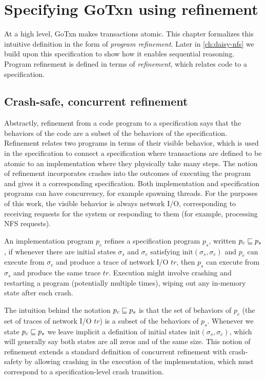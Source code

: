 \section{Specifying GoTxn using refinement}%
\label{sec:txn:spec}

At a high level, GoTxn makes transactions atomic. This chapter formalizes this
intuitive definition in the form of \emph{program refinement}. Later in
\cref{ch:daisy-nfs} we build upon this specification to show how it enables
sequential reasoning. Program refinement is defined in terms of
\emph{refinement}, which relates code to a specification.

\subsection{Crash-safe, concurrent refinement}

Abstractly, refinement from a code program to a specification says that the
behaviors of the code are a subset of the behaviors of the specification.
Refinement relates two programs in terms of their visible behavior, which is
used in the specification to connect a specification where transactions are
defined to be atomic to an implementation where they physically take many steps.
The notion of refinement incorporates crashes into the outcomes of executing the
program and gives it a corresponding specification. Both implementation and
specification programs can have concurrency, for example spawning threads. For
the purposes of this work, the visible behavior is always network I/O,
corresponding to receiving requests for the system or responding to them (for
example, processing NFS requests).

\begin{definition}[Refinement]
  An implementation program $p_{c}$ refines a specification program $p_{s}$,
written $p_{c} \sqsubseteq p_{s}$, if whenever there are initial states
$\sigma_{s}$ and $\sigma_{c}$ satisfying $\mathrm{init}(\sigma_{s}, \sigma_{c})$
and $p_{c}$ can execute from $\sigma_{c}$ and produce a trace of network I/O
$\textit{tr}$, then $p_{s}$ can execute from $\sigma_{s}$ and produce the same trace
$\textit{tr}$.  Execution might involve crashing and restarting a program (potentially
multiple times), wiping out any in-memory state after each crash.
  \label{def:refinement}
\end{definition}

The intuition behind the notation $p_{c} \sqsubseteq p_{s}$ is that the set of
behaviors of $p_{c}$ (the set of traces of network I/O $\textit{tr}$) is a subset of the
behaviors of $p_{s}$. Whenever we state $p_{c} \sqsubseteq p_{s}$ we leave implicit
a definition of initial states $\mathrm{init}(\sigma_{s}, \sigma_{c})$, which
will generally say both states are all zeros and of the same size. This notion
of refinement extends a standard definition of concurrent refinement with
crash-safety by allowing crashing in the execution of the implementation, which
must correspond to a specification-level crash transition.

